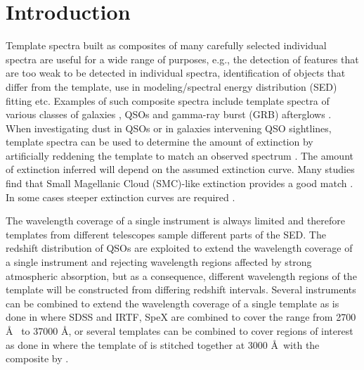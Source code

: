 \documentclass{aa}    %
\newcommand{\sectlabel}[1]{\label{sect:#1}}
\begin{document}
\maketitle
%


\section{Introduction}     \sectlabel{introduction}
Template spectra built as composites of many carefully selected
individual spectra are useful for a wide range of purposes, e.g., the
detection of features that are too weak to be detected in individual
spectra, identification of objects that differ from the template, use
in modeling/spectral energy distribution (SED) fitting etc. Examples of such composite spectra
include template spectra of various classes of galaxies
\citep{Mannucci2001, Shapley2003, Dobos2012}, QSOs
\citep{CristianiS.andVio1990, Boyle1990, Francis1991, Zheng1997,
  Brotherton2000, VandenBerk2001, Telfer2002, Richards2006a,
  Glikman2006, Lusso2015} and gamma-ray burst (GRB) afterglows \citep{Christensen2011}.
When investigating dust in QSOs or in galaxies intervening QSO
sightlines, template spectra can be used to determine the amount of
extinction by artificially reddening the template to match an observed
spectrum
\citep[e.g.,][]{Glikman2007,Urrutia2009,Wang2012,Fynbo2013,Krogager2015}.
The amount of extinction inferred will depend on the assumed
extinction curve. Many studies find that Small Magellanic Cloud (SMC)-like extinction provides
a good match \citep{Richards2003,Hopkins2004}. In some cases steeper
extinction curves are required
\citep{Fynbo2013,Jiang2013,Leighly2014}.

The wavelength coverage of a single instrument is always limited and
therefore templates from different telescopes sample different parts
of the SED. The redshift distribution of QSOs
are exploited to extend the wavelength coverage of a single instrument
and rejecting wavelength regions affected by strong atmospheric
absorption, but as a consequence, different wavelength regions of the
template will be constructed from differing redshift
intervals. Several instruments can be combined to extend the
wavelength coverage of a single template as is done in
\citet{Glikman2006} where SDSS \citep{Gunn2006} and IRTF, SpeX
\citep{Rayner2003} are combined to cover the range from 2700 \AA~ to
37000 \AA, or several templates can be combined to cover regions of
interest as done in \citet{Zhou2010} where the template of
\citet{VandenBerk2001} is stitched together at 3000 \AA~with the
composite by \citet{Glikman2006}. 
\end{document}
